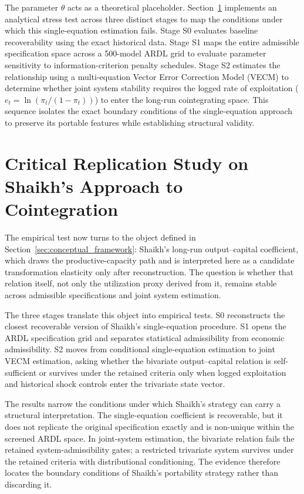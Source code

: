 \documentclass[11pt]{article}
\begin{document}
The parameter $\theta$ acts as a theoretical placeholder. Section~\ref{sec:replication_strategy} implements an analytical stress test across three distinct stages to map the conditions under which this single-equation estimation fails. Stage S0 evaluates baseline recoverability using the exact historical data. Stage S1 maps the entire admissible specification space across a 500-model ARDL grid to evaluate parameter sensitivity to information-criterion penalty schedules. Stage S2 estimates the relationship using a multi-equation Vector Error Correction Model (VECM) to determine whether joint system stability requires the logged rate of exploitation ($e_t = \ln(\pi_t / (1 - \pi_t))$) to enter the long-run cointegrating space. This sequence isolates the exact boundary conditions of the single-equation approach to preserve its portable features while establishing structural validity.

\section{Critical Replication Study on Shaikh’s Approach to Cointegration}
\label{sec:replication_strategy}

The empirical test now turns to the object defined in Section~\ref{sec:conceptual_framework}: Shaikh's long-run output--capital coefficient, which draws the productive-capacity path and is interpreted here as a candidate transformation elasticity only after reconstruction. The question is whether that relation itself, not only the utilization proxy derived from it, remains stable across admissible specifications and joint system estimation.

The three stages translate this object into empirical tests. S0 reconstructs the closest recoverable version of Shaikh's single-equation procedure. S1 opens the ARDL specification grid and separates statistical admissibility from economic admissibility. S2 moves from conditional single-equation estimation to joint VECM estimation, asking whether the bivariate output--capital relation is self-sufficient or survives under the retained criteria only when logged exploitation and historical shock controls enter the trivariate state vector.

The results narrow the conditions under which Shaikh's strategy can carry a structural interpretation. The single-equation coefficient is recoverable, but it does not replicate the original specification exactly and is non-unique within the screened ARDL space. In joint-system estimation, the bivariate relation fails the retained system-admissibility gates; a restricted trivariate system survives under the retained criteria with distributional conditioning. The evidence therefore locates the boundary conditions of Shaikh's portability strategy rather than discarding it.
\end{document}
